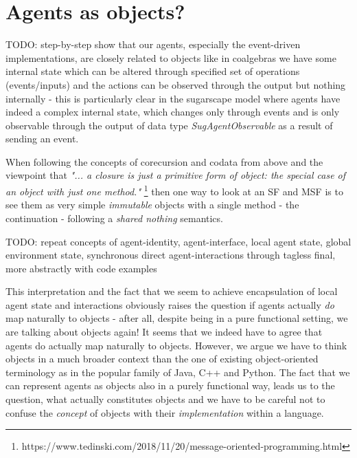 
\section{Agents as objects?}
TODO: step-by-step show that our agents, especially the event-driven implementations, are closely related to objects
like in coalgebras we have some internal state which can be altered through specified set of operations (events/inputs) and the actions can be observed through the output but nothing internally - this is particularly clear in the sugarscape model where agents have indeed a complex internal state, which changes only through events and is only observable through the output of data type \textit{SugAgentObservable} as a result of sending an event.

When following the concepts of corecursion and codata from above and the viewpoint that \textit{"... a closure is just a primitive form of object: the special case of an object with just one method."} \footnote{https://www.tedinski.com/2018/11/20/message-oriented-programming.html} then one way to look at an SF and MSF is to see them as very simple \textit{immutable} objects with a single method - the continuation - following a \textit{shared nothing} semantics. 

TODO: repeat concepts of agent-identity, agent-interface, local agent state, global environment state, synchronous direct agent-interactions through tagless final, more abstractly with code examples


This interpretation and the fact that we seem to achieve encapsulation of local agent state and interactions obviously raises the question if agents actually \textit{do} map naturally to objects - after all, despite being in a pure functional setting, we are talking about objects again! It seems that we indeed have to agree that agents do actually map naturally to objects. However, we argue we have to think objects in a much broader context than the one of existing object-oriented terminology as in the popular family of Java, C++ and Python. The fact that we can represent agents as objects also in a purely functional way, leads us to the question, what actually constitutes objects and we have to be careful not to confuse the \textit{concept} of objects with their \textit{implementation} within a language.

